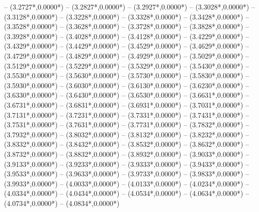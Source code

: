 {	-- ({3.2727*\dx},{0.0000*\dy})
	-- ({3.2827*\dx},{0.0000*\dy})
	-- ({3.2927*\dx},{0.0000*\dy})
	-- ({3.3028*\dx},{0.0000*\dy})
	-- ({3.3128*\dx},{0.0000*\dy})
	-- ({3.3228*\dx},{0.0000*\dy})
	-- ({3.3328*\dx},{0.0000*\dy})
	-- ({3.3428*\dx},{0.0000*\dy})
	-- ({3.3528*\dx},{0.0000*\dy})
	-- ({3.3628*\dx},{0.0000*\dy})
	-- ({3.3728*\dx},{0.0000*\dy})
	-- ({3.3828*\dx},{0.0000*\dy})
	-- ({3.3928*\dx},{0.0000*\dy})
	-- ({3.4028*\dx},{0.0000*\dy})
	-- ({3.4128*\dx},{0.0000*\dy})
	-- ({3.4229*\dx},{0.0000*\dy})
	-- ({3.4329*\dx},{0.0000*\dy})
	-- ({3.4429*\dx},{0.0000*\dy})
	-- ({3.4529*\dx},{0.0000*\dy})
	-- ({3.4629*\dx},{0.0000*\dy})
	-- ({3.4729*\dx},{0.0000*\dy})
	-- ({3.4829*\dx},{0.0000*\dy})
	-- ({3.4929*\dx},{0.0000*\dy})
	-- ({3.5029*\dx},{0.0000*\dy})
	-- ({3.5129*\dx},{0.0000*\dy})
	-- ({3.5229*\dx},{0.0000*\dy})
	-- ({3.5329*\dx},{0.0000*\dy})
	-- ({3.5430*\dx},{0.0000*\dy})
	-- ({3.5530*\dx},{0.0000*\dy})
	-- ({3.5630*\dx},{0.0000*\dy})
	-- ({3.5730*\dx},{0.0000*\dy})
	-- ({3.5830*\dx},{0.0000*\dy})
	-- ({3.5930*\dx},{0.0000*\dy})
	-- ({3.6030*\dx},{0.0000*\dy})
	-- ({3.6130*\dx},{0.0000*\dy})
	-- ({3.6230*\dx},{0.0000*\dy})
	-- ({3.6330*\dx},{0.0000*\dy})
	-- ({3.6430*\dx},{0.0000*\dy})
	-- ({3.6530*\dx},{0.0000*\dy})
	-- ({3.6631*\dx},{0.0000*\dy})
	-- ({3.6731*\dx},{0.0000*\dy})
	-- ({3.6831*\dx},{0.0000*\dy})
	-- ({3.6931*\dx},{0.0000*\dy})
	-- ({3.7031*\dx},{0.0000*\dy})
	-- ({3.7131*\dx},{0.0000*\dy})
	-- ({3.7231*\dx},{0.0000*\dy})
	-- ({3.7331*\dx},{0.0000*\dy})
	-- ({3.7431*\dx},{0.0000*\dy})
	-- ({3.7531*\dx},{0.0000*\dy})
	-- ({3.7631*\dx},{0.0000*\dy})
	-- ({3.7731*\dx},{0.0000*\dy})
	-- ({3.7832*\dx},{0.0000*\dy})
	-- ({3.7932*\dx},{0.0000*\dy})
	-- ({3.8032*\dx},{0.0000*\dy})
	-- ({3.8132*\dx},{0.0000*\dy})
	-- ({3.8232*\dx},{0.0000*\dy})
	-- ({3.8332*\dx},{0.0000*\dy})
	-- ({3.8432*\dx},{0.0000*\dy})
	-- ({3.8532*\dx},{0.0000*\dy})
	-- ({3.8632*\dx},{0.0000*\dy})
	-- ({3.8732*\dx},{0.0000*\dy})
	-- ({3.8832*\dx},{0.0000*\dy})
	-- ({3.8932*\dx},{0.0000*\dy})
	-- ({3.9033*\dx},{0.0000*\dy})
	-- ({3.9133*\dx},{0.0000*\dy})
	-- ({3.9233*\dx},{0.0000*\dy})
	-- ({3.9333*\dx},{0.0000*\dy})
	-- ({3.9433*\dx},{0.0000*\dy})
	-- ({3.9533*\dx},{0.0000*\dy})
	-- ({3.9633*\dx},{0.0000*\dy})
	-- ({3.9733*\dx},{0.0000*\dy})
	-- ({3.9833*\dx},{0.0000*\dy})
	-- ({3.9933*\dx},{0.0000*\dy})
	-- ({4.0033*\dx},{0.0000*\dy})
	-- ({4.0133*\dx},{0.0000*\dy})
	-- ({4.0234*\dx},{0.0000*\dy})
	-- ({4.0334*\dx},{0.0000*\dy})
	-- ({4.0434*\dx},{0.0000*\dy})
	-- ({4.0534*\dx},{0.0000*\dy})
	-- ({4.0634*\dx},{0.0000*\dy})
	-- ({4.0734*\dx},{0.0000*\dy})
	-- ({4.0834*\dx},{0.0000*\dy})
}
